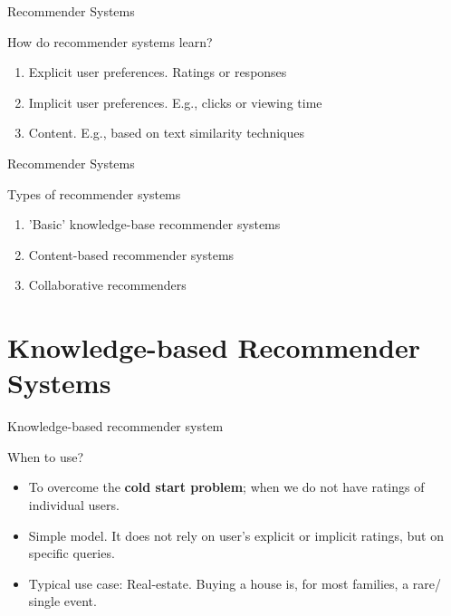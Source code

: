\documentclass[handout]{beamer}
\begin{document}
\begin{frame}{Recommender Systems} 
\begin{block}{How do recommender systems learn?}
	\begin{enumerate}
		\item<2-> \alert{Explicit user preferences}. Ratings or responses 
		\item<3-> \alert{Implicit user preferences}. E.g., clicks or viewing time
		\item<3-> \alert{Content}. E.g., based on text similarity techniques
	\end{enumerate}
\end{block}
\end{frame}

\begin{frame}{Recommender Systems} 
\begin{block}{Types of recommender systems  \parencite{Wieland2021, Locherbach2018, Moller2018}}
	\begin{enumerate}
		\item 'Basic' knowledge-base recommender systems
		\item Content-based recommender systems
		\item Collaborative  recommenders 
	\end{enumerate}
\end{block}{\tiny }
\end{frame}

\section[Knowledge-based RecSys]{Knowledge-based Recommender Systems}
\begin{frame}{Knowledge-based recommender system} 
\begin{block}{When to use?}
	\begin{itemize}
		\item<2-> To overcome the \textbf{cold start problem}; when we do not have ratings of individual users. 
		\item<3-> Simple model. It does not rely on user's explicit or implicit ratings, but on specific queries.
		\item<4-> Typical use case: Real-estate. Buying a house is, for most families, a rare/ single event. 
	\end{itemize}
\end{block}
\end{frame}

\end{document}
